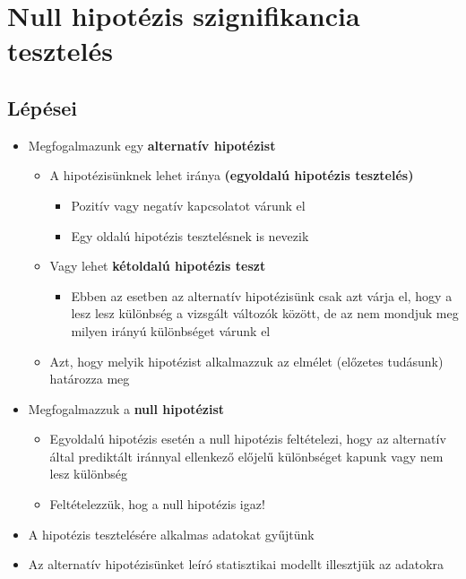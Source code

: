 \documentclass[
  letterpaper,
  DIV=11,
  numbers=noendperiod]{scrreprt}
\providecommand{\tightlist}{%
  \setlength{\itemsep}{0pt}\setlength{\parskip}{0pt}}\usepackage{longtable,booktabs,array}
\begin{document}
\hypertarget{null-hipotuxe9zis-szignifikancia-teszteluxe9s}{%
\section{Null hipotézis szignifikancia
tesztelés}\label{null-hipotuxe9zis-szignifikancia-teszteluxe9s}}

\hypertarget{luxe9puxe9sei}{%
\subsection{Lépései}\label{luxe9puxe9sei}}

\begin{itemize}
\item
  Megfogalmazunk egy \textbf{alternatív hipotézist}

  \begin{itemize}
  \item
    A hipotézisünknek lehet iránya \textbf{(egyoldalú hipotézis
    tesztelés)}

    \begin{itemize}
    \item
      Pozitív vagy negatív kapcsolatot várunk el
    \item
      Egy oldalú hipotézis tesztelésnek is nevezik
    \end{itemize}
  \item
    Vagy lehet \textbf{kétoldalú hipotézis teszt}

    \begin{itemize}
    \tightlist
    \item
      Ebben az esetben az alternatív hipotézisünk csak azt várja el,
      hogy a lesz lesz különbség a vizsgált változók között, de az nem
      mondjuk meg milyen irányú különbséget várunk el
    \end{itemize}
  \item
    Azt, hogy melyik hipotézist alkalmazzuk az elmélet (előzetes
    tudásunk) határozza meg
  \end{itemize}
\item
  Megfogalmazzuk a \textbf{null hipotézist}

  \begin{itemize}
  \tightlist
  \item
    Egyoldalú hipotézis esetén a null hipotézis feltételezi, hogy az
    alternatív által prediktált iránnyal ellenkező előjelű különbséget
    kapunk vagy nem lesz különbség
  \item
    Feltételezzük, hog a null hipotézis igaz!
  \end{itemize}
\item
  A hipotézis tesztelésére alkalmas adatokat gyűjtünk
\item
  Az alternatív hipotézisünket leíró statisztikai modellt illesztjük az
  adatokra


\end{itemize}
\end{document}
